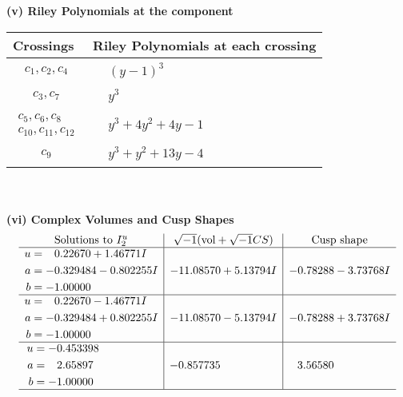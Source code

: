 \documentclass[1p]{elsarticle_modified}
\theoremstyle{definition}
\newcommand{\I}{\sqrt{-1}}
\begin{document}
\flushleft \textbf{(v) Riley Polynomials at the component}\newline \\
\begin{tabular}{m{50pt}|m{274pt}}
Crossings & \hspace{64pt}Riley Polynomials at each crossing \\
\hline $$\begin{aligned}c_{1},c_{2},c_{4}\end{aligned}$$&$\begin{aligned}
&(y-1)^3
\end{aligned}$\\
\hline $$\begin{aligned}c_{3},c_{7}\end{aligned}$$&$\begin{aligned}
&y^3
\end{aligned}$\\
\hline $$\begin{aligned}c_{5},c_{6},c_{8}\\c_{10},c_{11},c_{12}\end{aligned}$$&$\begin{aligned}
&y^3+4 y^2+4 y-1
\end{aligned}$\\
\hline $$\begin{aligned}c_{9}\end{aligned}$$&$\begin{aligned}
&y^3+y^2+13 y-4
\end{aligned}$\\
\hline
\end{tabular}\\~\\
\newpage\flushleft \textbf{(vi) Complex Volumes and Cusp Shapes}
$$\begin{array}{c|c|c}  
\text{Solutions to }I^u_{2}& \I (\text{vol} + \sqrt{-1}CS) & \text{Cusp shape}\\
 \hline 
\begin{aligned}
u &= \phantom{-}0.22670 + 1.46771 I \\
a &= -0.329484 - 0.802255 I \\
b &= -1.00000\phantom{ +0.000000I}\end{aligned}
 & -11.08570 + 5.13794 I & -0.78288 - 3.73768 I \\ \hline\begin{aligned}
u &= \phantom{-}0.22670 - 1.46771 I \\
a &= -0.329484 + 0.802255 I \\
b &= -1.00000\phantom{ +0.000000I}\end{aligned}
 & -11.08570 - 5.13794 I & -0.78288 + 3.73768 I \\ \hline\begin{aligned}
u &= -0.453398\phantom{ +0.000000I} \\
a &= \phantom{-}2.65897\phantom{ +0.000000I} \\
b &= -1.00000\phantom{ +0.000000I}\end{aligned}
 & -0.857735\phantom{ +0.000000I} & \phantom{-}3.56580\phantom{ +0.000000I}\\
 \hline 
 \end{array}$$\newpage\newpage\renewcommand{\arraystretch}{1}
\end{document}
